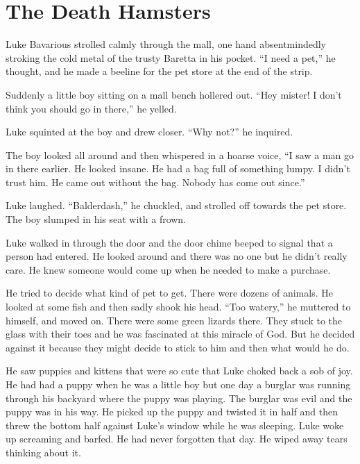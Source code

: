 \chapter{The Death Hamsters}





Luke Bavarious strolled calmly through the mall, one hand
absentmindedly stroking the cold metal of the trusty Baretta in his
pocket. ``I need a pet,'' he thought, and he made a beeline for the
pet store at the end of the strip.



Suddenly a little boy sitting on a mall bench hollered out. ``Hey
mister! I don't think you should go in there,'' he yelled.



Luke squinted at the boy and drew closer. ``Why not?'' he
inquired.



The boy looked all around and then whispered in a hoarse voice, ``I
saw a man go in there earlier. He looked insane. He had a bag full
of something lumpy. I didn't trust him. He came out without the
bag. Nobody has come out since.''



Luke laughed. ``Balderdash,'' he chuckled, and strolled off towards
the pet store. The boy slumped in his seat with a frown.



Luke walked in through the door and the door chime beeped to signal
that a person had entered. He looked around and there was no one
but he didn't really care. He knew someone would come up when he
needed to make a purchase.



He tried to decide what kind of pet to get. There were dozens of
animals. He looked at some fish and then sadly shook his head. ``Too
watery,'' he muttered to himself, and moved on. There were some
green lizards there. They stuck to the glass with their toes and he
was fascinated at this miracle of God. But he decided against it
because they might decide to stick to him and then what would he
do.



He saw puppies and kittens that were so cute that Luke choked back
a sob of joy. He had had a puppy when he was a little boy but one
day a burglar was running through his backyard where the puppy was
playing. The burglar was evil and the puppy was in his way. He
picked up the puppy and twisted it in half and then threw the
bottom half against Luke's window while he was sleeping. Luke woke
up screaming and barfed. He had never forgotten that day. He wiped
away tears thinking about it.



